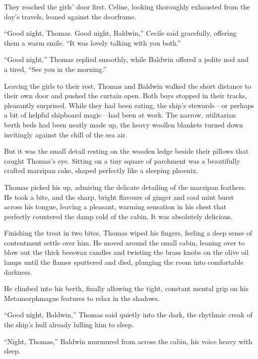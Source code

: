 They reached the girls' door first. Celine, looking thoroughly exhausted from the day's travels, leaned against the doorframe.

\enquote{Good night, Thomas. Good night, Baldwin,} Cecile said gracefully, offering them a warm smile. \enquote{It was lovely talking with you both.}

\enquote{Good night,} Thomas replied smoothly, while Baldwin offered a polite nod and a tired, \enquote{See you in the morning.}

Leaving the girls to their rest, Thomas and Baldwin walked the short distance to their own door and pushed the curtain open. Both boys stopped in their tracks, pleasantly surprised. While they had been eating, the ship's stewards---or perhaps a bit of helpful shipboard magic---had been at work. The narrow, utilitarian berth beds had been neatly made up, the heavy woollen blankets turned down invitingly against the chill of the sea air.

But it was the small detail resting on the wooden ledge beside their pillows that caught Thomas's eye. Sitting on a tiny square of parchment was a beautifully crafted marzipan cake, shaped perfectly like a sleeping phoenix.

Thomas picked his up, admiring the delicate detailing of the marzipan feathers. He took a bite, and the sharp, bright flavours of ginger and cool mint burst across his tongue, leaving a pleasant, warming sensation in his chest that perfectly countered the damp cold of the cabin. It was absolutely delicious.

Finishing the treat in two bites, Thomas wiped his fingers, feeling a deep sense of contentment settle over him. He moved around the small cabin, leaning over to blow out the thick beeswax candles and twisting the brass knobs on the olive oil lamps until the flames sputtered and died, plunging the room into comfortable darkness.

He climbed into his berth, finally allowing the tight, constant mental grip on his Metamorphmagus features to relax in the shadows.

\enquote{Good night, Baldwin,} Thomas said quietly into the dark, the rhythmic creak of the ship's hull already lulling him to sleep.

\enquote{Night, Thomas,} Baldwin murmured from across the cabin, his voice heavy with sleep.

